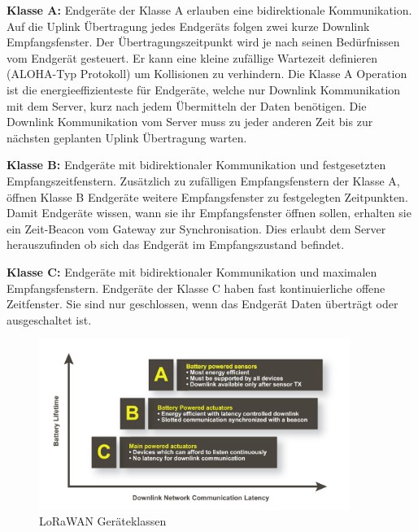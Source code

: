 \textbf{Klasse A:} Endgeräte der Klasse A erlauben eine bidirektionale Kommunikation. Auf die Uplink Übertragung jedes Endgeräts folgen zwei kurze Downlink Empfangsfenster. Der Übertragungszeitpunkt wird je nach seinen Bedürfnissen vom Endgerät gesteuert. Er kann eine kleine zufällige Wartezeit definieren (ALOHA-Typ Protokoll) um Kollisionen zu verhindern. Die Klasse A Operation ist die energieeffizienteste für Endgeräte, welche nur Downlink Kommunikation mit dem Server, kurz nach jedem Übermitteln der Daten benötigen. Die Downlink Kommunikation vom Server muss zu jeder anderen Zeit bis zur nächsten geplanten Uplink Übertragung warten.

\textbf{Klasse B:} Endgeräte mit bidirektionaler Kommunikation und festgesetzten Empfangszeitfenstern. Zusätzlich zu zufälligen Empfangsfenstern der Klasse A, öffnen Klasse B Endgeräte weitere Empfangsfenster zu festgelegten Zeitpunkten. Damit Endgeräte wissen, wann sie ihr Empfangsfenster öffnen sollen, erhalten sie ein Zeit-Beacon vom Gateway zur Synchronisation. Dies erlaubt dem Server herauszufinden ob sich das Endgerät im Empfangszustand befindet.

\textbf{Klasse C:} Endgeräte mit bidirektionaler Kommunikation und maximalen Empfangsfenstern. Endgeräte der Klasse C haben fast kontinuierliche offene Zeitfenster. Sie sind nur geschlossen, wenn das Endgerät Daten überträgt oder ausgeschaltet ist.

\begin{figure}[H]
     \centering
        \includegraphics[width=0.9\textwidth]{pictures/device-classes.png}
    \caption{LoRaWAN Geräteklassen}
    \label{fig:LoRaWAN Geräteklassen}
\end{figure}

